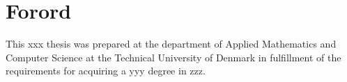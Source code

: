 \chapter{Forord}
This xxx thesis was prepared at the department of Applied Mathematics and Computer Science at the Technical University of Denmark in fulfillment of the requirements for acquiring a yyy degree in zzz.

\vfill

\iffalse
{
\centering
    \thesislocation{}, \today\\[1cm]
\begin{flushright}
    \thesisauthor{}
\end{flushright}
}
\fi